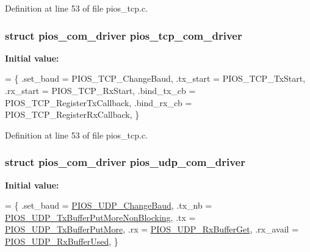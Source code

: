 Definition at line 53 of file pios\-\_\-tcp.\-c.

\hypertarget{group___p_i_o_s___u_d_p_gae22d8a8963cc7f41d351eca5d6ec835a}{
\subsubsection[{pios\-\_\-tcp\-\_\-com\-\_\-driver}]{\setlength{\rightskip}{0pt plus 5cm}struct {\bf pios\-\_\-com\-\_\-driver} pios\-\_\-tcp\-\_\-com\-\_\-driver}}\label{group___p_i_o_s___u_d_p_gae22d8a8963cc7f41d351eca5d6ec835a}
{\bfseries Initial value\-:}
\begin{DoxyCode}
= \{
        .set\_baud   = PIOS\_TCP\_ChangeBaud,
        .tx\_start   = PIOS\_TCP\_TxStart,
        .rx\_start   = PIOS\_TCP\_RxStart,
        .bind\_tx\_cb = PIOS\_TCP\_RegisterTxCallback,
        .bind\_rx\_cb = PIOS\_TCP\_RegisterRxCallback,
\}
\end{DoxyCode}


Definition at line 53 of file pios\-\_\-tcp.\-c.

\hypertarget{group___p_i_o_s___u_d_p_ga58da5534fd5007351a8ed77275aa8ad2}{
\subsubsection[{pios\-\_\-udp\-\_\-com\-\_\-driver}]{\setlength{\rightskip}{0pt plus 5cm}struct {\bf pios\-\_\-com\-\_\-driver} pios\-\_\-udp\-\_\-com\-\_\-driver}}\label{group___p_i_o_s___u_d_p_ga58da5534fd5007351a8ed77275aa8ad2}
{\bfseries Initial value\-:}
\begin{DoxyCode}
= \{
  .set\_baud = \hyperlink{group___p_i_o_s___u_d_p_gab239bb40339f719f5e74fc1a1d59f699}{PIOS\_UDP\_ChangeBaud},
  .tx\_nb    = \hyperlink{group___p_i_o_s___u_d_p_ga4022689f32ee127e513d0b45cc245ef2}{PIOS\_UDP\_TxBufferPutMoreNonBlocking},
  .tx       = \hyperlink{group___p_i_o_s___u_d_p_ga8869ef7484833f6b65a75deff15c6392}{PIOS\_UDP\_TxBufferPutMore},
  .rx       = \hyperlink{group___p_i_o_s___u_d_p_gad1b2424657998d3a43158204600bac9c}{PIOS\_UDP\_RxBufferGet},
  .rx\_avail = \hyperlink{group___p_i_o_s___u_d_p_gadc19a674676506c5c09c470ed78e2672}{PIOS\_UDP\_RxBufferUsed},
\}
\end{DoxyCode}


